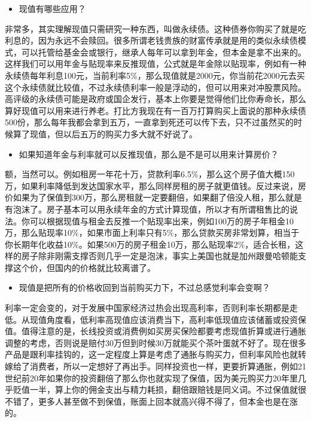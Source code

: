\documentclass[
  letterpaper,
  DIV=11,
  numbers=noendperiod]{scrreprt}
\providecommand{\tightlist}{%
  \setlength{\itemsep}{0pt}\setlength{\parskip}{0pt}}\usepackage{longtable,booktabs,array}
\begin{document}
\begin{itemize}
\tightlist
\item
  现值有哪些应用？
\end{itemize}

非常多，其实理解现值只需研究一种东西，叫做永续债。这种债券你购买了就是吃利息的，因为永远不会赎回。很多所谓老钱贵族的财富传承就是用的类似永续债模式，可以托管给基金会或银行，继承人每年可以拿到年金，但本金是拿不出来的。这样我们可以用年金与贴现率来反推现值，公式就是年金除以贴现率，例如有一种永续债每年利息100元，当前利率5\%，那么现值就是2000元，你当前花2000元去买这个永续债就比较值，不过永续债利率一般是浮动的，但可以用来对冲股票风险。高评级的永续债可能是政府或国企发行，基本上你要是觉得他们比你寿命长，那么算好现值可以用来进行养老。打比方我现在有一百万打算购买上面说的那种永续债500份，那么每年我都会拿到五万，一直拿到死还可以传下去，只不过虽然买的时候算了现值，但以后五万的购买力多大就不好说了。

\begin{itemize}
\tightlist
\item
  如果知道年金与利率就可以反推现值，那么是不是可以用来计算房价？
\end{itemize}

额，当然可以。例如租房一年花十万，贷款利率6.5\%，那么这个房子值大概150万，如果利率降低到发达国家水平，那么同样房租的房子就更值钱。反过来说，房价如果为了保值到300万，那么房租就一定要翻倍，如果翻了倍没人租，那么就是有泡沫了。房子基本可以用永续年金的方式计算现值，所以才有所谓租售比的说法。你可以根据现值与租金去反推一个贴现率出来，例如100万的房子年租金10万，那么贴现率10\%，如果市面上利率只有5\%，那么贷款买房非常划算，相当于你长期年化收益10\%。如果500万的房子租金10万，那么贴现率2\%，适合长租，这样的房子除非刚需支撑否则几乎一定是泡沫，事实上美国也就是加州跟曼哈顿能支撑这个价，但国内的价格就比较离谱了。

\begin{itemize}
\tightlist
\item
  现值是把所有的价格收回到当前购买力下，不过总感觉利率会变啊？
\end{itemize}

利率一定会变的，对于发展中国家经济过热会出现高利率，否则利率长期都是走低。从现值角度看，低利率高现值应该消费当下，高利率低现值应该储蓄或投资保值。值得注意的是，长线投资或消费例如买房买保险都要考虑现值折算或进行通胀调整的考虑，否则说是赔付30万但到时候30万就能买个茶叶蛋就不好了。现在很多产品是跟利率挂钩的，这一定程度上算是考虑了通胀与购买力，但利率风险也就转嫁给了消费者，所以一定想好了再出手。同样投资也一样，更要折算通胀，例如21世纪前20年如果你的投资翻倍了那么你也就实现了保值，因为美元购买力20年里几乎贬值一半，算上你的佣金支出与精力耗损，翻倍跟赔钱是同义词。不过保值就很不错了，更多人甚至做不到保值，账面上回本就高兴得不得了，但本金也是在涨的。
\end{document}

